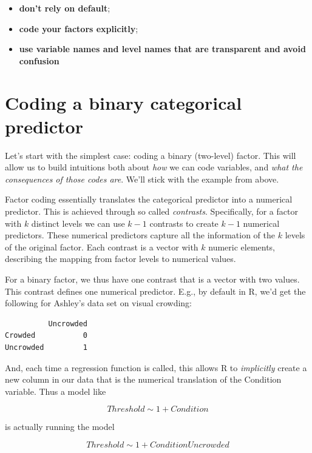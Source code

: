 \documentclass[
]{article}
\providecommand{\tightlist}{%
  \setlength{\itemsep}{0pt}\setlength{\parskip}{0pt}}
\begin{document}
\begin{itemize}
\tightlist
\item
  \textbf{don't rely on default};
\item
  \textbf{code your factors explicitly};
\item
  \textbf{use variable names and level names that are transparent and
  avoid confusion}
\end{itemize}

\hypertarget{coding-a-binary-categorical-predictor}{%
\section{Coding a binary categorical
predictor}\label{coding-a-binary-categorical-predictor}}

Let's start with the simplest case: coding a binary (two-level) factor.
This will allow us to build intuitions both about \emph{how} we can code
variables, and \emph{what the consequences of those codes are}. We'll
stick with the example from above.

Factor coding essentially translates the categorical predictor into a
numerical predictor. This is achieved through so called
\emph{contrasts}. Specifically, for a factor with \(k\) distinct levels
we can use \(k-1\) contrasts to create \(k-1\) numerical predictors.
These numerical predictors capture all the information of the \(k\)
levels of the original factor. Each contrast is a vector with \(k\)
numeric elements, describing the mapping from factor levels to numerical
values.

For a binary factor, we thus have one contrast that is a vector with two
values. This contrast defines one numerical predictor. E.g., by default
in R, we'd get the following for Ashley's data set on visual crowding:

\footnotesize

\begin{verbatim}
          Uncrowded
Crowded           0
Uncrowded         1
\end{verbatim}

\normalsize

And, each time a regression function is called, this allows R to
\emph{implicitly} create a new column in our data that is the numerical
translation of the Condition variable. Thus a model like

\[ Threshold \sim 1 + Condition \]

is actually running the model

\[ Threshold \sim 1 + ConditionUncrowded \]
\end{document}
